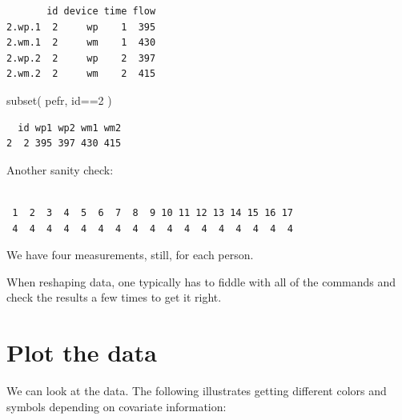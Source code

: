 \documentclass[
  letterpaper,
  DIV=11,
  numbers=noendperiod]{scrreprt}
\newenvironment{Shaded}{\begin{snugshade}}{\end{snugshade}}
\newcommand{\AttributeTok}[1]{\textcolor[rgb]{0.49,0.56,0.16}{#1}}
\newcommand{\DecValTok}[1]{\textcolor[rgb]{0.25,0.63,0.44}{#1}}
\newcommand{\FloatTok}[1]{\textcolor[rgb]{0.25,0.63,0.44}{#1}}
\newcommand{\FunctionTok}[1]{\textcolor[rgb]{0.02,0.16,0.49}{#1}}
\newcommand{\NormalTok}[1]{\textcolor[rgb]{0.00,0.44,0.13}{#1}}
\newcommand{\OtherTok}[1]{\textcolor[rgb]{0.00,0.44,0.13}{#1}}
\newcommand{\SpecialCharTok}[1]{\textcolor[rgb]{0.25,0.44,0.63}{#1}}
\begin{document}
\begin{verbatim}
       id device time flow
2.wp.1  2     wp    1  395
2.wm.1  2     wm    1  430
2.wp.2  2     wp    2  397
2.wm.2  2     wm    2  415
\end{verbatim}

\begin{Shaded}
\begin{Highlighting}[]
\FunctionTok{subset}\NormalTok{( pefr, id}\SpecialCharTok{==}\DecValTok{2}\NormalTok{ )}
\end{Highlighting}
\end{Shaded}

\begin{verbatim}
  id wp1 wp2 wm1 wm2
2  2 395 397 430 415
\end{verbatim}

Another sanity check:

\begin{Shaded}
\end{Shaded}

\begin{verbatim}

 1  2  3  4  5  6  7  8  9 10 11 12 13 14 15 16 17 
 4  4  4  4  4  4  4  4  4  4  4  4  4  4  4  4  4 
\end{verbatim}

We have four measurements, still, for each person.

When reshaping data, one typically has to fiddle with all of the
commands and check the results a few times to get it right.

\hypertarget{plot-the-data}{%
\section{Plot the data}\label{plot-the-data}}

We can look at the data. The following illustrates getting different
colors and symbols depending on covariate information:

\begin{Shaded}
\end{Shaded}
\end{document}
